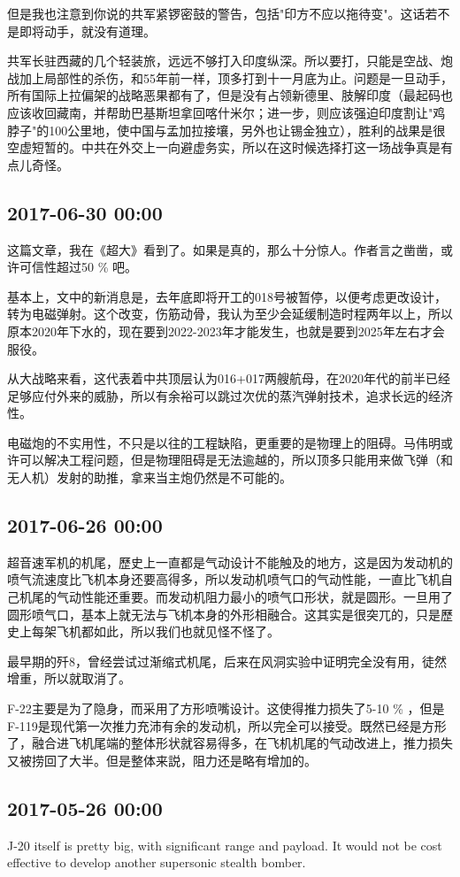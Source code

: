 \documentclass[twocolumn]{ctexart}
\begin{document}
但是我也注意到你说的共军紧锣密鼓的警告，包括"印方不应以拖待变"。这话若不是即将动手，就没有道理。

共军长驻西藏的几个轻装旅，远远不够打入印度纵深。所以要打，只能是空战、炮战加上局部性的杀伤，和55年前一样，顶多打到十一月底为止。问题是一旦动手，所有国际上拉偏架的战略恶果都有了，但是没有占领新德里、肢解印度（最起码也应该收回藏南，并帮助巴基斯坦拿回喀什米尔；进一步，则应该强迫印度割让"鸡脖子"的100公里地，使中国与孟加拉接壤，另外也让锡金独立），胜利的战果是很空虚短暂的。中共在外交上一向避虚务实，所以在这时候选择打这一场战争真是有点儿奇怪。\subsection*{2017-06-30 00:00}
这篇文章，我在《超大》看到了。如果是真的，那么十分惊人。作者言之凿凿，或许可信性超过50 \% 吧。

基本上，文中的新消息是，去年底即将开工的018号被暂停，以便考虑更改设计，转为电磁弹射。这个改变，伤筋动骨，我认为至少会延缓制造时程两年以上，所以原本2020年下水的，现在要到2022-2023年才能发生，也就是要到2025年左右才会服役。

从大战略来看，这代表着中共顶层认为016+017两艘航母，在2020年代的前半已经足够应付外来的威胁，所以有余裕可以跳过次优的蒸汽弹射技术，追求长远的经济性。

电磁炮的不实用性，不只是以往的工程缺陷，更重要的是物理上的阻碍。马伟明或许可以解决工程问题，但是物理阻碍是无法逾越的，所以顶多只能用来做飞弹（和无人机）发射的助推，拿来当主炮仍然是不可能的。\subsection*{2017-06-26 00:00}
超音速军机的机尾，歷史上一直都是气动设计不能触及的地方，这是因为发动机的喷气流速度比飞机本身还要高得多，所以发动机喷气口的气动性能，一直比飞机自己机尾的气动性能还重要。而发动机阻力最小的喷气口形状，就是圆形。一旦用了圆形喷气口，基本上就无法与飞机本身的外形相融合。这其实是很突兀的，只是歷史上每架飞机都如此，所以我们也就见怪不怪了。

最早期的歼8，曾经尝试过渐缩式机尾，后来在风洞实验中证明完全没有用，徒然增重，所以就取消了。

F-22主要是为了隐身，而采用了方形喷嘴设计。这使得推力损失了5-10 \% ，但是F-119是现代第一次推力充沛有余的发动机，所以完全可以接受。既然已经是方形了，融合进飞机尾端的整体形状就容易得多，在飞机机尾的气动改进上，推力损失又被捞回了大半。但是整体来説，阻力还是略有增加的。\subsection*{2017-05-26 00:00}
J-20 itself is pretty big, with significant range and payload. It would not be cost effective to develop another supersonic stealth bomber.
\end{document}
